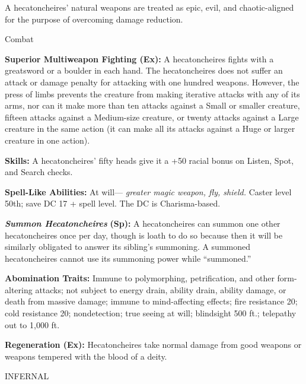\documentclass{article}
\begin{document}
A hecatoncheires' natural weapons are treated as epic, evil, and chaotic-aligned 
for the purpose of overcoming damage reduction.

Combat\textbf{ }

\textbf{Superior Multiweapon Fighting (Ex):} A hecatoncheires fights with a greatsword 
or a boulder in each hand. The hecatoncheires does not suffer an attack or damage 
penalty for attacking with one hundred weapons. However, the press of limbs prevents 
the creature from making iterative attacks with any of its arms, nor can it make 
more than ten attacks against a Small or smaller creature, fifteen attacks against 
a Medium-size creature, or twenty attacks against a Large creature in the same 
action (it can make all its attacks against a Huge or larger creature in one action). 

\textbf{Skills:} A hecatoncheires' fifty heads give it a +50 racial bonus on Listen, 
Spot, and Search checks. 

\textbf{Spell-Like Abilities:} At will--- \textit{greater magic weapon, fly, shield. 
}Caster level 50th; save DC 17 + spell level. The DC is Charisma-based.

\textit{\textbf{Summon Hecatoncheires }}\textbf{(Sp):} A hecatoncheires can summon 
one other hecatoncheires once per day, though is loath to do so because then it 
will be similarly obligated to answer its sibling's summoning. A summoned hecatoncheires 
cannot use its summoning power while ``summoned.'' 

\textbf{Abomination Traits: }Immune to polymorphing, petrification, and other form-altering 
attacks; not subject to energy drain, ability drain, ability damage, or death from 
massive damage; immune to mind-affecting effects; fire resistance 20; cold resistance 
20; nondetection; true seeing at will; blindsight 500 ft.; telepathy out to 1,000 
ft. 

\textbf{Regeneration (Ex):} Hecatoncheires take normal damage from good weapons 
or weapons tempered with the blood of a deity. 

\vspace{12pt}
{\LARGE{}INFERNAL }
\end{document}
